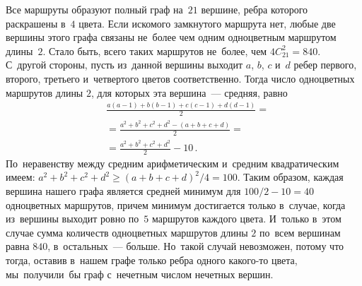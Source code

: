 \ifincludesolutions
Все маршруты образуют полный граф на~$21$ вершине, ребра которого раскрашены
в~$4$ цвета.
Если искомого замкнутого маршрута нет, любые две вершины этого графа связаны
не~более чем одним одноцветным маршрутом длины~$2$.
Стало быть, всего таких маршрутов не~более, чем $4 C_{21}^2 = 840$.
С~другой стороны, пусть из~данной вершины выходит $a$, $b$, $c$ и~$d$ ребер
первого, второго, третьего и~четвертого цветов соответственно.
Тогда число одноцветных маршрутов длины $2$, для которых эта
вершина~--- средняя, равно
\begin{align*}
    &
    \frac{
        a (a - 1) + {} b (b - 1) + c (c - 1) + d (d - 1)
    }{2}
=\\&{}=
    \frac{a^2 + b^2 + c^2 + d^2 - (a + b + c + d)}{2}
=\\&{}=
    \frac{a^2 + b^2 + c^2 + d^2}{2} - 10
\, . \end{align*}
По~неравенству между средним арифметическим и~средним квадратическим имеем:
\(
    a^2 + b^2 + c^2 + d^2
\geq
    (a + b + c + d)^2 / 4
=
    100
\).
Таким образом, каждая вершина нашего графа является средней минимум для
$100 / 2 - 10 = 40$ одноцветных маршрутов, причем минимум достигается только
в~случае, когда из~вершины выходит ровно по~$5$ маршрутов каждого цвета.
И~только в~этом случае сумма количеств одноцветных маршрутов длины $2$ по~всем
вершинам равна $840$, в~остальных~--- больше.
Но~такой случай невозможен, потому что тогда, оставив в~нашем графе только
ребра одного какого-то цвета, мы~получили~бы граф с~нечетным числом нечетных
вершин.
\fi %

\endgroup %

